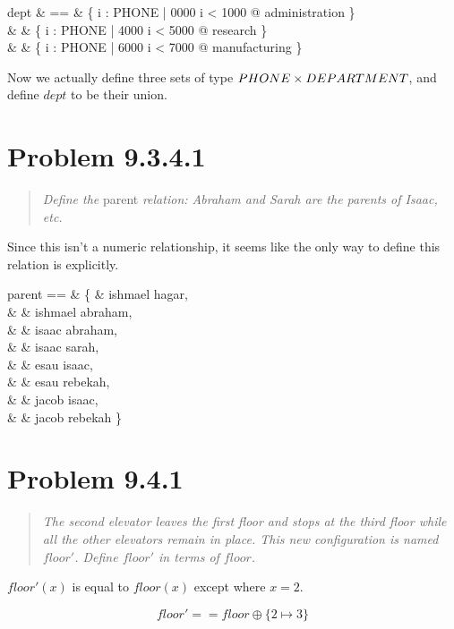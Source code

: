 \documentclass[10pt]{article}
\begin{document}
\begin{syntax}
  dept & == & \{ \lambda i : PHONE | 0000 \leq i < 1000 @  administration \} \union \\
       &    & \{ \lambda i : PHONE | 4000 \leq i < 5000 @ research \} \union       \\
       &    & \{ \lambda i : PHONE | 6000 \leq i < 7000 @  manufacturing \}
\end{syntax}

Now we actually define three sets of type $PHONE \times DEPARTMENT$, and define $dept$ to be their
union.



\section{Problem 9.3.4.1}
\begin{quote}
  {\it Define the} parent {\it relation: Abraham and Sarah are the parents of Isaac, etc.}
\end{quote}

Since this isn't a numeric relationship, it seems like the only way to define this relation is
explicitly.

\begin{syntax}
  parent == & \{ & ishmael \mapsto hagar,   \\
            &    & ishmael \mapsto abraham, \\
            &    & isaac \mapsto abraham,   \\
            &    & isaac \mapsto sarah,     \\
            &    & esau \mapsto isaac,      \\
            &    & esau \mapsto rebekah,    \\
            &    & jacob \mapsto isaac,     \\
            &    & jacob \mapsto rebekah \}
\end{syntax}



\section{Problem 9.4.1}
\begin{quote}
  {\it The second elevator leaves the first floor and stops at the third floor while all the other
    elevators remain in place.  This new configuration is named $floor'$.  Define $floor'$ in terms
    of $floor$.}
\end{quote}

$floor'(x)$ is equal to $floor(x)$ except where $x = 2$.

\[ floor' == floor \oplus \{ 2 \mapsto 3 \} \]
\end{document}
